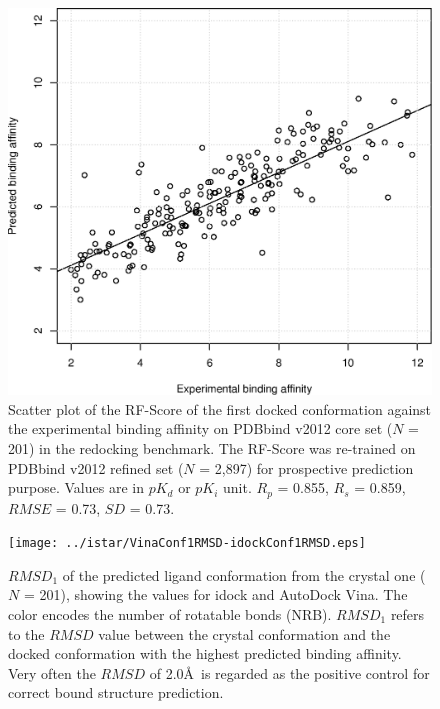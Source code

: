 \begin{figure}
\begin{center}
\includegraphics[width=\linewidth]{../istar/pK-idockConf1RFScore.eps}
\end{center}
\caption{Scatter plot of the RF-Score of the first docked conformation against the experimental binding affinity on PDBbind v2012 core set ($N$ = 201) in the redocking benchmark. The RF-Score was re-trained on PDBbind v2012 refined set ($N$ = 2,897) for prospective prediction purpose. Values are in $pK_d$ or $pK_i$ unit. $R_p$ = 0.855, $R_s$ = 0.859, $RMSE$ = 0.73, $SD$ = 0.73.}
\label{istar:pK-idockConf1RFScore}
\end{figure}

\begin{figure}
\begin{center}
\texttt{[image: ../istar/VinaConf1RMSD-idockConf1RMSD.eps]}
\end{center}
\caption{$RMSD_1$ of the predicted ligand conformation from the crystal one ($N$ = 201), showing the values for idock and AutoDock Vina. The color encodes the number of rotatable bonds (NRB). $RMSD_1$ refers to the $RMSD$ value between the crystal conformation and the docked conformation with the highest predicted binding affinity. Very often the $RMSD$ of 2.0\AA\ is regarded as the positive control for correct bound structure prediction.}
\label{istar:VinaConf1RMSD-idockConf1RMSD}
\end{figure}

